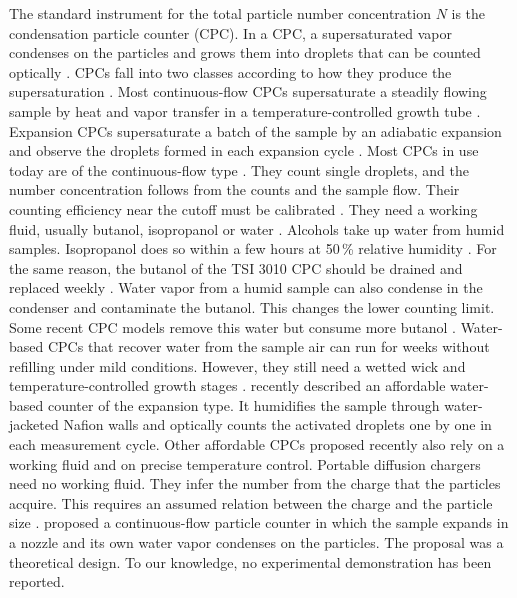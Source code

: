 \documentclass[preprint,review,12pt,authoryear]{elsarticle}
\begin{document}
The standard instrument for the total particle number concentration $N$ is the condensation particle
counter (CPC). In a CPC, a supersaturated vapor condenses on the particles and grows them into droplets that
can be counted optically \citep{stolzenburg1991ultrafine}.
CPCs fall into two classes according to how they produce the supersaturation \citep{mcmurry2000history}.
Most continuous-flow CPCs supersaturate a steadily flowing sample by heat and vapor transfer in a
temperature-controlled growth tube \citep{agarwal1980continuous}. Expansion CPCs supersaturate a batch of
the sample by an adiabatic expansion and observe the droplets formed in each expansion cycle
\citep{miller1982supersaturation}.
Most CPCs in use today are of the continuous-flow type
\citep[p.~1476]{hering2025affordable}.
They count single droplets, and the
number concentration follows from the counts and the sample flow. Their counting efficiency near the
cutoff must be calibrated \citep{iso27891}. They need a working
fluid, usually butanol, isopropanol or water \citep{sem2002design,hering2005laminar}. Alcohols take up water
from humid samples. Isopropanol does so within a few hours at 50\,\% relative humidity
\citep{sem2002design}. For the same reason, the butanol of the TSI 3010 CPC should be drained and replaced
weekly \citep{tsi2002cpc3010}. Water vapor from a humid sample can also condense in the condenser and
contaminate the butanol. This changes the lower counting limit. Some recent CPC models remove this water but
consume more butanol \citep{tsi2017cpc3750}.
Water-based CPCs that recover water from the sample air can run for weeks without
refilling under mild conditions. However, they still need a wetted wick and temperature-controlled growth
stages \citep{hering2019magic}. \citet{hering2025affordable} recently described an affordable water-based
counter of the expansion type. It humidifies the sample through water-jacketed Nafion walls and optically
counts the activated droplets one by one in each measurement cycle. Other affordable CPCs proposed recently
\citep{yoo2019mems,collins2026opensource} also rely on a working fluid and on precise temperature control.
Portable diffusion chargers need no working fluid. They infer the number from the charge that the particles
acquire. This requires an assumed relation between the charge and the particle size
\citep{fierz2011design,asbach2024partector}.
\citet{gehin2004theoretical} proposed a continuous-flow particle counter in which the sample expands
in a nozzle and its own water vapor condenses on the particles. The proposal was a theoretical design.
To our knowledge, no experimental demonstration has been reported.
\end{document}
